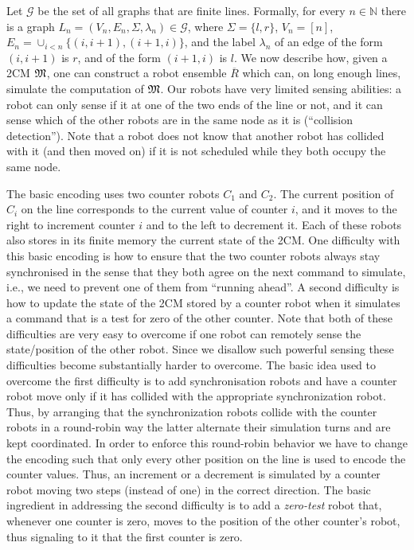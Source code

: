 \documentclass{llncs}
\def\gclass{\mathcal{G}}
\def\nat{\mathbb{N}}
\newcommand{\tup}[1]{\overline{#1}}
\newcommand{\counter}{\ensuremath{C}}
\begin{document}
Let $\gclass$ be the set of all graphs that are finite lines. Formally, for every $n \in \nat$ there is a graph $L_n = (V_n,E_n,\Sigma,\lambda_n) \in \gclass$, where $\Sigma = \{l,r\}$, $V_n = [n]$, $E_n = \cup_{i < n} \{(i,i+1), (i+1,i)\}$, and the label $\lambda_n$ of an edge of the form $(i,i+1)$ is $r$, and of the form $(i+1,i)$ is $l$. We now describe how, given a 2CM $\mathfrak{M}$, one can construct a robot ensemble $\tup{R}$ which can, on long enough lines, simulate the computation of $\mathfrak{M}$.
Our robots have very limited sensing abilities: a robot can only sense if it at one of the two ends of the line or not, and it can sense which of the other robots are in the same node as it is (``collision detection''). Note that a robot does not know that another robot has collided with it (and then moved on) if it is not scheduled while they both occupy the same node.

The basic encoding uses two counter robots $\counter_1$ and $\counter_2$. The current position of $\counter_i$ on the line corresponds to the current value of counter $i$, and it moves to the right to increment counter $i$ and to the left to decrement it. Each of these robots also stores in its finite memory the current state of the 2CM. One difficulty with this basic encoding is how to ensure that the two counter robots always stay synchronised in the sense that they both agree on the next command to simulate, i.e., we need to prevent one of them from ``running ahead''. A second difficulty is how to update the state of the 2CM stored by a counter robot when it simulates a command that is a test for zero of the other counter. Note that both of these difficulties are very easy to overcome if one robot can remotely sense the state/position of the other robot.
Since we disallow such powerful sensing these difficulties become substantially harder to overcome. The basic idea used to overcome the first difficulty is to add synchronisation robots and have a counter robot move only if it has collided with the appropriate synchronization robot. Thus, by arranging that the synchronization robots collide with the counter robots in a round-robin way the latter alternate their simulation turns and are kept coordinated. In order to enforce this round-robin behavior we have to change the encoding such that only every other position on the line is used to encode the counter values. Thus, an increment or a decrement is simulated by a counter robot moving two steps (instead of one) in the correct direction. The basic ingredient in addressing the second difficulty is to add a {\em zero-test} robot that, whenever one counter is zero, moves to the position of the other counter's robot, thus signaling to it that the first counter is zero.
\end{document}
